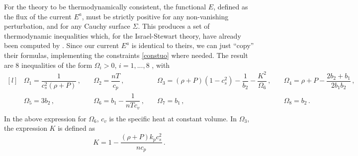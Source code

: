 \documentclass[a4paper, amsfonts, amssymb, amsmath, reprint, showkeys, nofootinbib, twoside, onecolumn, notitlepage]{revtex4-1}
\theoremstyle{definition}
\theoremstyle{theorem}
\begin{document}
For the theory to be thermodynamically consistent, the functional $E$, defined as the flux of the current $E^a$, must be strictly positive for any non-vanishing perturbation, and for any Cauchy surface $\Sigma$. This produces a set of thermodynamic inequalities which, for the Israel-Stewart theory, have already been computed by \citet{Hishcock1983}. Since our current $E^a$ is identical to theirs, we can just ``copy'' their formulas, implementing the constraints \eqref{constuo} where needed. The result are 8 inequalities of the form $\Omega_i >0$, $i=1,...,8$ \cite{Hishcock1983}, with
\begin{equation}\label{Omeguna}
\begin{matrix*}[l]
& \Omega_1 = \dfrac{1}{c_s^2 (\rho+P)} \, , \quad & \Omega_2 = \dfrac{nT}{c_p} \, , \quad & \Omega_3 = (\rho +P )(1-c_s^2) - \dfrac{1}{b_2} - \dfrac{K^2}{\Omega_6} \, , \quad & \Omega_4 = \rho+P - \dfrac{2b_2 +b_1}{2b_1 b_2} \, , \\
& \Omega_5 = 3b_2 \, , \quad & \Omega_6 = b_1 - \dfrac{1}{nTc_v} \, , \quad & \Omega_7 = b_1 \, , \quad & \Omega_8 = b_2 \, . \\
\end{matrix*}
\end{equation}
In the above expression for $\Omega_6$, $c_v$ is the specific heat at constant volume. In $\Omega_3$, the expression $K$ is defined as
\begin{equation}
K = 1 - \dfrac{(\rho+P)k_p c_s^2}{nc_p} \, .
\end{equation}
\end{document}
